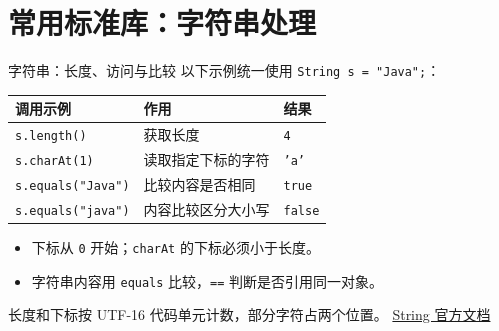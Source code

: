 \documentclass[aspectratio=169]{beamer}
\begin{document}
\section{常用标准库：字符串处理}

\begin{frame}[fragile]{字符串：长度、访问与比较}
  以下示例统一使用 \texttt{String s = "Java";}：
  \begin{center}
    \renewcommand{\arraystretch}{1.25}
    \begin{tabular}{lll}
      \textbf{调用示例} & \textbf{作用} & \textbf{结果} \\
      \hline
      \texttt{s.length()} & 获取长度 & \texttt{4} \\
      \texttt{s.charAt(1)} & 读取指定下标的字符 & \texttt{'a'} \\
      \texttt{s.equals("Java")} & 比较内容是否相同 & \texttt{true} \\
      \texttt{s.equals("java")} & 内容比较区分大小写 & \texttt{false} \\
    \end{tabular}
  \end{center}
  \medskip
  \begin{itemize}
    \item 下标从 \texttt{0} 开始；\texttt{charAt} 的下标必须小于长度。
    \item 字符串内容用 \texttt{equals} 比较，\texttt{==} 判断是否引用同一对象。
  \end{itemize}
  \medskip
  {\footnotesize 长度和下标按 UTF-16 代码单元计数，部分字符占两个位置。
  \href{https://docs.oracle.com/en/java/javase/25/docs/api/java.base/java/lang/String.html}{String 官方文档}}
\end{frame}
\end{document}
